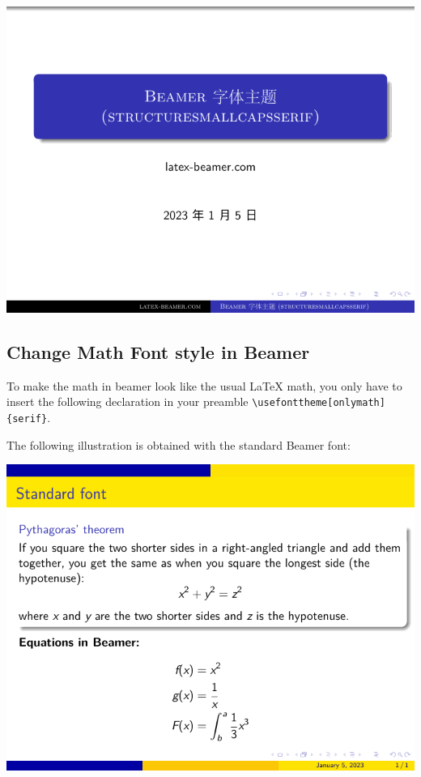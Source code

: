 \includegraphics[page=2]{examples/beamer/beamerfont10.pdf}

\subsection{Change Math Font style in Beamer}

To make the math in beamer look like the usual {\LaTeX} math, you only have to insert the following declaration in your preamble \verb|\usefonttheme[onlymath]{serif}|.

The following illustration is obtained with the standard Beamer font:

\includegraphics{examples/beamer/beamerfont11.pdf}

